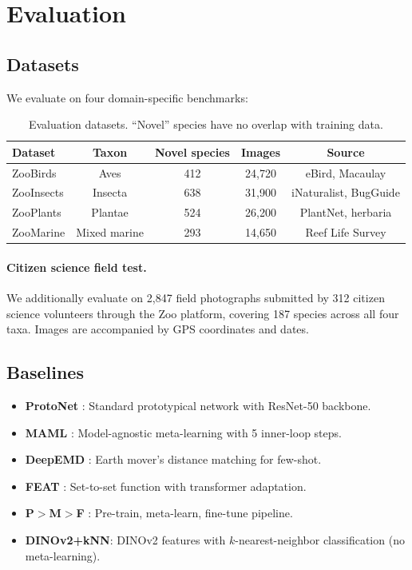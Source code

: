 \section{Evaluation}

\label{sec:evaluation}

\subsection{Datasets}

We evaluate on four domain-specific benchmarks:

\begin{table}[H]
\centering
\caption{Evaluation datasets. ``Novel'' species have no overlap with
training data.}
\label{tab:datasets}
\begin{tabular}{lcccc}
\toprule
\textbf{Dataset} & \textbf{Taxon} & \textbf{Novel species} &
  \textbf{Images} & \textbf{Source} \\
\midrule
ZooBirds & Aves & 412 & 24{,}720 & eBird, Macaulay \\
ZooInsects & Insecta & 638 & 31{,}900 & iNaturalist, BugGuide \\
ZooPlants & Plantae & 524 & 26{,}200 & PlantNet, herbaria \\
ZooMarine & Mixed marine & 293 & 14{,}650 & Reef Life Survey \\
\bottomrule
\end{tabular}
\end{table}

\paragraph{Citizen science field test.} We additionally evaluate on
2{,}847 field photographs submitted by 312 citizen science volunteers
through the Zoo platform, covering 187 species across all four taxa.
Images are accompanied by GPS coordinates and dates.

\subsection{Baselines}

\begin{itemize}
  \item \textbf{ProtoNet} \citep{snell2017prototypical}: Standard
    prototypical network with ResNet-50 backbone.
  \item \textbf{MAML} \citep{finn2017model}: Model-agnostic
    meta-learning with 5 inner-loop steps.
  \item \textbf{DeepEMD} \citep{zhang2020deepemd}: Earth mover's
    distance matching for few-shot.
  \item \textbf{FEAT} \citep{ye2020few}: Set-to-set function with
    transformer adaptation.
  \item \textbf{P$>$M$>$F} \citep{hu2022pushing}: Pre-train, meta-learn,
    fine-tune pipeline.
  \item \textbf{DINOv2+kNN}: DINOv2 features with $k$-nearest-neighbor
    classification (no meta-learning).
\end{itemize}

